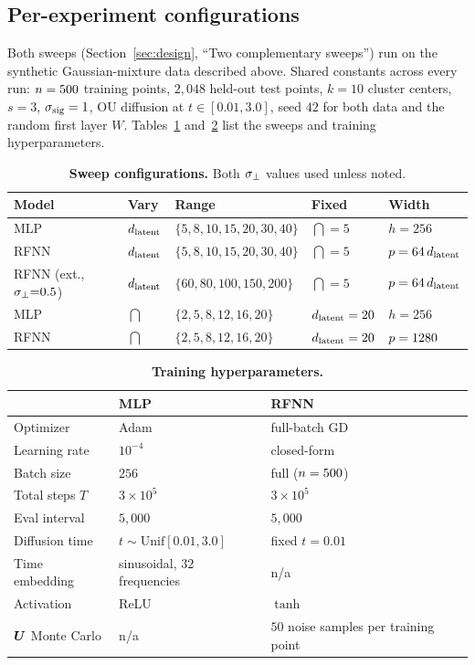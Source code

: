\subsection{Per-experiment configurations}
\label{app:exp-configs}

Both sweeps (Section~\ref{sec:design}, ``Two complementary sweeps'')
run on the synthetic Gaussian-mixture data described above. Shared
constants across every run: $n = 500$ training points, $2{,}048$
held-out test points, $k = 10$ cluster centers, $s = 3$, $\sigma_{\mathrm{sig}} = 1$,
OU diffusion at $t \in [0.01, 3.0]$, seed $42$ for both data and the
random first layer $W$. Tables~\ref{tab:exp-configs}
and~\ref{tab:exp-hparams} list the sweeps and training
hyperparameters.

\begin{table}[!t]
\centering\small
\setlength{\tabcolsep}{4pt}
\caption{\textbf{Sweep configurations.} Both $\sigma_{\perp}$ values used
unless noted.}
\label{tab:exp-configs}
\begin{tabular}{@{}lllll@{}}
\toprule
Model & Vary & Range & Fixed & Width \\
\midrule
MLP                       & $d_{\mathrm{latent}}$ & $\{5, 8, 10, 15, 20, 30, 40\}$ & $\dint = 5$ & $h = 256$ \\
RFNN                      & $d_{\mathrm{latent}}$ & $\{5, 8, 10, 15, 20, 30, 40\}$ & $\dint = 5$ & $p = 64\,d_{\mathrm{latent}}$ \\
RFNN (ext., $\sigma_{\perp}{=}0.5$) & $d_{\mathrm{latent}}$ & $\{60, 80, 100, 150, 200\}$ & $\dint = 5$ & $p = 64\,d_{\mathrm{latent}}$ \\
MLP                       & $\dint$ & $\{2, 5, 8, 12, 16, 20\}$ & $d_{\mathrm{latent}} = 20$ & $h = 256$ \\
RFNN                      & $\dint$ & $\{2, 5, 8, 12, 16, 20\}$ & $d_{\mathrm{latent}} = 20$ & $p = 1280$ \\
\bottomrule
\end{tabular}
\end{table}

\begin{table}[!t]
\centering\small
\setlength{\tabcolsep}{6pt}
\caption{\textbf{Training hyperparameters.}}
\label{tab:exp-hparams}
\begin{tabular}{@{}lll@{}}
\toprule
 & MLP & RFNN \\
\midrule
Optimizer & Adam & full-batch GD \\
Learning rate & $10^{-4}$ & closed-form \\
Batch size & $256$ & full ($n = 500$) \\
Total steps $T$ & $3 \times 10^5$ & $3 \times 10^5$ \\
Eval interval & $5{,}000$ & $5{,}000$ \\
Diffusion time & $t \sim \mathrm{Unif}[0.01, 3.0]$ & fixed $t = 0.01$ \\
Time embedding & sinusoidal, $32$ frequencies & n/a\\
Activation & ReLU & $\tanh$ \\
$\bm{U}$ Monte Carlo & n/a& $50$ noise samples per training point \\
\bottomrule
\end{tabular}
\end{table}

